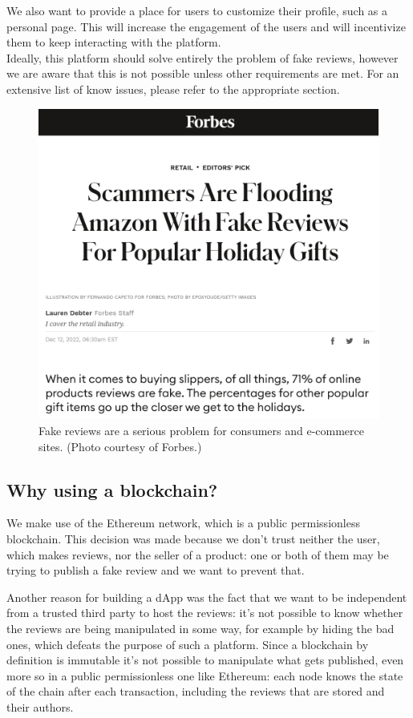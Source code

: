 \documentclass[12pt,a4paper,oneside]{article}
\theoremstyle{definition}
\begin{document}
We also want to provide a place for users to customize their profile, such as a personal page. This will increase the engagement of the users and will incentivize them to keep interacting with the platform. \\
Ideally, this platform should solve entirely the problem of fake reviews, however we are aware that this is not possible unless other requirements are met. For an extensive list of know issues, please refer to the appropriate section.

\begin{figure}[H]
	\centering
	\includegraphics[width=.49\linewidth]{figures/forbes-amazon.png}
	\caption{Fake reviews are a serious problem for consumers and e-commerce sites. (Photo courtesy of Forbes.)}
\end{figure}

\subsection{Why using a blockchain?}
We make use of the Ethereum network, which is a public permissionless blockchain. This decision was made because we don't trust neither the user, which makes reviews, nor the seller of a product: one or both of them may be trying to publish a fake review and we want to prevent that.

Another reason for building a dApp was the fact that we want to be independent from a trusted third party to host the reviews: it's not possible to know whether the reviews are being manipulated in some way, for example by hiding the bad ones, which defeats the purpose of such a platform. Since a blockchain by definition is immutable it's not possible to manipulate what gets published, even more so in a public permissionless one like Ethereum: each node knows the state of the chain after each transaction, including the reviews that are stored and their authors.
\end{document}
